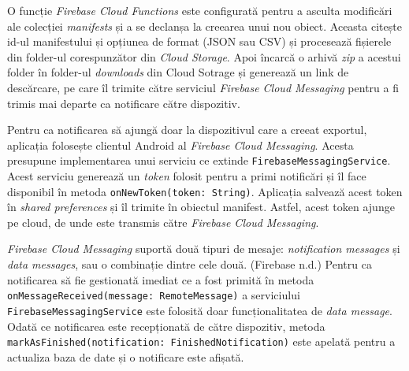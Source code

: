 O funcție \emph{Firebase Cloud Functions} este configurată pentru a asculta modificări ale colecției \emph{manifests} și a se declanșa la creearea unui nou obiect. Aceasta citește id-ul manifestului și opțiunea de format (JSON sau CSV) și procesează fișierele din folder-ul corespunzător din \emph{Cloud Storage}. Apoi încarcă o arhivă \emph{zip} a acestui folder în folder-ul \emph{downloads} din Cloud Sotrage și generează un link de descărcare, pe care îl trimite către serviciul \emph{Firebase Cloud Messaging} pentru a fi trimis mai departe ca notificare către dispozitiv.

Pentru ca notificarea să ajungă doar la dispozitivul care a creeat exportul, aplicația folosește clientul Android al \emph{Firebase Cloud Messaging}. Acesta presupune implementarea unui serviciu ce extinde \texttt{FirebaseMessagingService}. Acest serviciu generează un \emph{token} folosit pentru a primi notificări și îl face disponibil în metoda \texttt{onNewToken(token:\ String)}. Aplicația salvează acest token în \emph{shared preferences} și îl trimite în obiectul manifest. Astfel, acest token ajunge pe cloud, de unde este transmis către \emph{Firebase Cloud Messaging}.

\emph{Firebase Cloud Messaging} suportă două tipuri de mesaje: \emph{notification messages} și \emph{data messages}, sau o combinație dintre cele două. (Firebase n.d.) Pentru ca notificarea să fie gestionată imediat ce a fost primită în metoda \texttt{onMessageReceived(message:\ RemoteMessage)} a serviciului \texttt{FirebaseMessagingService} este folosită doar funcționalitatea de \emph{data message}. Odată ce notificarea este recepționată de către dispozitiv, metoda \texttt{markAsFinished(notification:\ FinishedNotification)} este apelată pentru a actualiza baza de date și o notificare este afișată.


